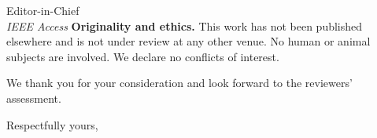 \documentclass[11pt, a4paper]{letter}
\begin{document}
\begin{letter}{%
  Editor-in-Chief\\
  \textit{IEEE Access}
}
\textbf{Originality and ethics.}
This work has not been published elsewhere and is not under review
at any other venue.  No human or animal subjects are involved.  We
declare no conflicts of interest.

We thank you for your consideration and look forward to the
reviewers' assessment.

\closing{Respectfully yours,}

\end{letter}
\end{document}
